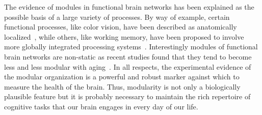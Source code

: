 

The evidence of modules in functional brain networks has been explained as the possible basis of a large variety of processes. By way of example, certain functional processes, like color vision, have been described as anatomically localized~\cite{zeki1998}, while others, like working memory, have been proposed to involve more globally integrated processing systems~\cite{dehaene1998,baddeley2003}.
Interestingly modules of functional brain networks are non-static as recent studies found that they tend to become less and less modular with aging~\cite{meunier2009a,song2014}. 
In all respects, the experimental evidence of the modular organization is a powerful and robust marker against which to measure the health of the brain. 
Thus, modularity is not only a biologically plausible feature but it is probably necessary to maintain the rich repertoire of cognitive tasks that our brain engages in every day of our life.

